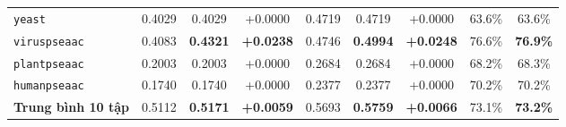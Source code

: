 \documentclass[10pt,a4paper,twoside]{article}
\begin{document}
\begin{table}[H]
{\begin{tabular}{lcccccccc}
\texttt{yeast}           & 0.4029 & 0.4029 & +0.0000 & 0.4719 & 0.4719 & +0.0000 & 63.6\% & 63.6\% \\
\texttt{viruspseaac}     & 0.4083 & \textbf{0.4321} & \textbf{+0.0238} & 0.4746 & \textbf{0.4994} & \textbf{+0.0248} & 76.6\% & \textbf{76.9\%} \\
\texttt{plantpseaac}     & 0.2003 & 0.2003 & +0.0000 & 0.2684 & 0.2684 & +0.0000 & 68.2\% & 68.3\% \\
\texttt{humanpseaac}     & 0.1740 & 0.1740 & +0.0000 & 0.2377 & 0.2377 & +0.0000 & 70.2\% & 70.2\% \\
\midrule
\textbf{Trung bình 10 tập} & 0.5112 & \textbf{0.5171} & \textbf{+0.0059} & 0.5693 & \textbf{0.5759} & \textbf{+0.0066} & 73.1\% & \textbf{73.2\%} \\
\bottomrule
\end{tabular}%
}
\end{table}
\end{document}
